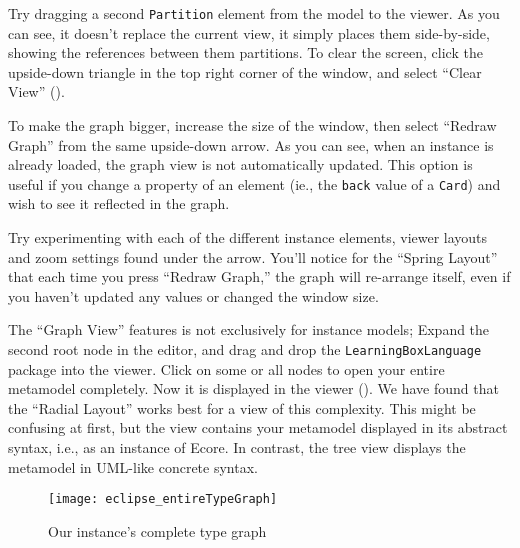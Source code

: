 \begin{stepbystep}
\item Try dragging a second \texttt{Partition} element from the model to the viewer. As you can see, it doesn't replace the current
view, it simply places them side-by-side, showing the references between them partitions. To clear the screen, click the upside-down triangle in the top
right corner of the window, and select ``Clear View'' ().

\item To make the graph bigger, increase the size of the window, then select ``Redraw Graph'' from the same upside-down arrow. As you can
see, when an instance is already loaded, the graph view is not automatically updated. This option is useful if you change a property of an element (ie., the
\texttt{back} value of a \texttt{Card}) and wish to see it reflected in the graph.

\item Try experimenting with each of the different instance elements, viewer layouts and zoom settings found under the arrow. You'll
notice for the ``Spring Layout'' that each time you press ``Redraw Graph,'' the graph will re-arrange itself, even if you haven't updated any values or changed the window size.

\item The ``Graph View'' features is not exclusively for instance models; Expand the second root node in the editor, and drag and
drop the \texttt{Learn\-ing\-Box\-Language} package into the viewer. Click on some or all nodes to open your entire metamodel completely. Now it is displayed in the viewer
(). We have found that the ``Radial Layout'' works best for a view of this complexity. This might be confusing at first,
but the view contains your metamodel displayed in its abstract syntax, i.e., as an instance of Ecore. In contrast, the tree view displays the metamodel in UML-like
concrete syntax.

\vspace{1cm}

\begin{figure}[htbp]
	\centering
  \texttt{[image: eclipse\_entireTypeGraph]}
	\caption{Our instance's complete type graph}
	\label{eclipse:graphView_typeGraph}
\end{figure}


\end{stepbystep}
